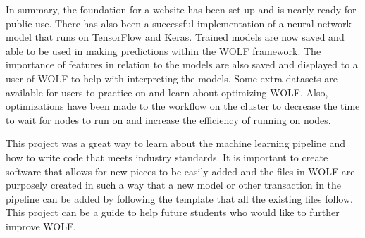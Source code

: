 In summary, the foundation for a website has been set up and is nearly ready for public use. There has also been a successful implementation of a neural network model that runs on TensorFlow and Keras. Trained models are now saved and able to be used in making predictions within the WOLF framework. The importance of features in relation to the models are also saved and displayed to a user of WOLF to help with interpreting the models. Some extra datasets are available for users to practice on and learn about optimizing WOLF. Also, optimizations have been made to the workflow on the cluster to decrease the time to wait for nodes to run on and increase the efficiency of running on nodes.

This project was a great way to learn about the machine learning pipeline and how to write code that meets industry standards. It is important to create software that allows for new pieces to be easily added and the files in WOLF are purposely created in such a way that a new model or other transaction in the pipeline can be added by following the template that all the existing files follow. This project can be a guide to help future students who would like to further improve WOLF.